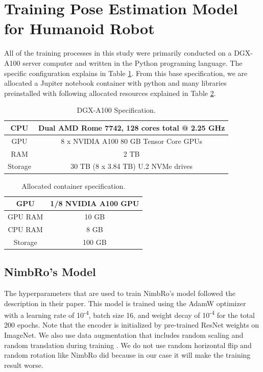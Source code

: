 \section{Training Pose Estimation Model for Humanoid Robot}
\label{sec:trainingrobot}

All of the training processes in this study were primarily conducted on a DGX-A100 server computer and written in the Python programing language. The specific configuration explains in Table \ref{tb:dgxa100}.
From this base specification, we are allocated a Jupiter notebook container with
python and many libraries preinstalled with following allocated resources explained in Table \ref{tb:allocatedcontainer}.

\begin{longtable}{|c|c|}
  \caption{DGX-A100 Specification.}
  \label{tb:dgxa100}\\
  \hline
  CPU     & Dual AMD Rome 7742, 128 cores total @ 2.25 GHz \\
  \hline
  GPU     & 8 x NVIDIA A100 80 GB Tensor Core GPUs  \\
  \hline
  RAM     & 2 TB \\
  \hline
  Storage & 30 TB (8 x 3.84 TB) U.2 NVMe drives \\
  \hline
\end{longtable}

\begin{longtable}{|c|c|}
  \caption{Allocated container specification.}
  \label{tb:allocatedcontainer}\\
  \hline
  GPU     & 1/8 NVIDIA A100 GPU \\
  \hline
  GPU RAM & 10 GB  \\
  \hline
  CPU RAM & 8 GB \\
  \hline
  Storage & 100 GB  \\
  \hline
\end{longtable}

\subsection{NimbRo's Model}
\label{subsec:trainingnimbromodel}

The hyperparameters that are used to train NimbRo's model followed the description in their paper.
This model is trained using the AdamW optimizer with a learning rate of 10\textsuperscript{-4},
batch size 16, and weight decay of 10\textsuperscript{-4} for the total 200 epochs.
Note that the encoder is initialized by pre-trained ResNet weights on ImageNet.
We also use data augmentation that includes random scaling and random translation during training \parencite{amini2021}.
We do not use random horizontal flip and random rotation like NimbRo did because in our case it will make the training result worse.

